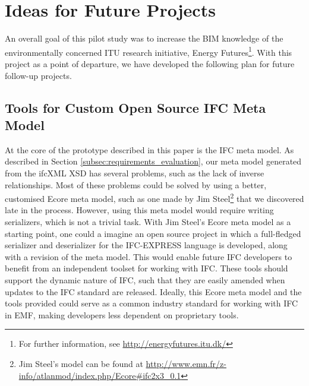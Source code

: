 
\section{Ideas for Future Projects}
\label{sec:plan_for_future_projects}
An overall goal of this pilot study was to increase the BIM knowledge of the environmentally concerned ITU research initiative, Energy Futures\footnote{For further information, see \url{http://energyfutures.itu.dk/}}. With this project as a point of departure, we have developed the following plan for future follow-up projects.

\subsection{Tools for Custom Open Source IFC Meta Model}
At the core of the prototype described in this paper is the IFC meta model. As described in Section \ref{subsec:requirements_evaluation}, our meta model generated from the ifcXML XSD has several problems, such as the lack of inverse relationships. Most of these problems could be solved by using a better, customised Ecore meta model, such as one made by Jim Steel\footnote{Jim Steel's model can be found at \url{http://www.emn.fr/z-info/atlanmod/index.php/Ecore#ifc2x3_0.1}} that we discovered late in the process. However, using this meta model would require writing serializers, which is not a trivial task. With Jim Steel's Ecore meta model as a starting point, one could a imagine an open source project in which a full-fledged serializer and deserializer for the IFC-EXPRESS language is developed, along with a revision of the meta model. This would enable future IFC developers to benefit from an independent toolset for working with IFC. These tools should support the dynamic nature of IFC, such that they are easily amended when updates to the IFC standard are released. Ideally, this Ecore meta model and the tools provided could serve as a common industry standard for working with IFC in EMF, making developers less dependent on proprietary tools.

